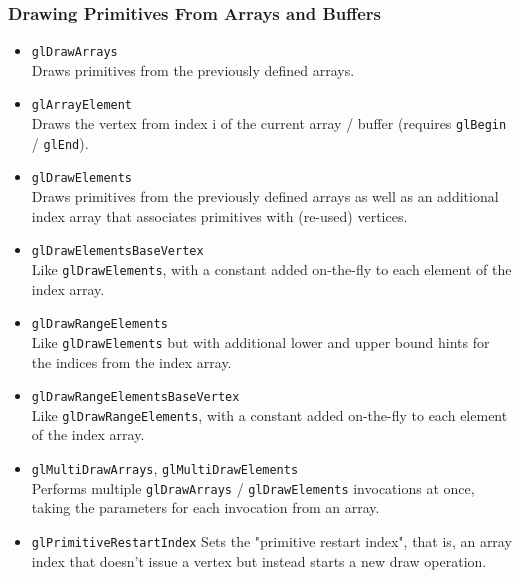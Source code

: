 \documentclass[12pt]{article}
\begin{document}
\subsubsection{Drawing Primitives From Arrays and Buffers}
\begin{itemize}
\item \texttt{glDrawArrays} \\
	Draws primitives from the previously defined arrays.
\item \texttt{glArrayElement} \\
	Draws the vertex from index i of the current array / buffer (requires \texttt{glBegin} / \texttt{glEnd}).
\item \texttt{glDrawElements} \\
	Draws primitives from the previously defined arrays as well as an additional index array that associates primitives with (re-used) vertices.
\item \texttt{glDrawElementsBaseVertex} \\
	Like \texttt{glDrawElements}, with a constant added on-the-fly to each element of the index array.
\item \texttt{glDrawRangeElements} \\
	Like \texttt{glDrawElements} but with additional lower and upper bound hints for the indices from the index array.
\item \texttt{glDrawRangeElementsBaseVertex} \\
	Like \texttt{glDrawRangeElements}, with a constant added on-the-fly to each element of the index array.
\item \texttt{glMultiDrawArrays}, \texttt{glMultiDrawElements} \\
	Performs multiple \texttt{glDrawArrays} / \texttt{glDrawElements} invocations at once, taking the parameters for each
	invocation from an array.
\item \texttt{glPrimitiveRestartIndex}
	Sets the "primitive restart index", that is, an array index that doesn't issue a vertex but instead starts a new draw operation.
\end{itemize}
\end{document}
